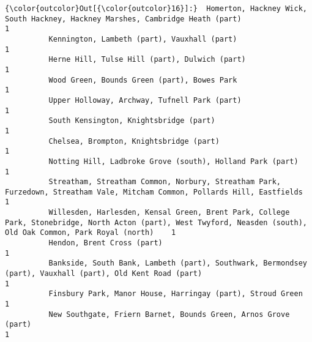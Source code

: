 \documentclass[11pt]{article}
\begin{document}
\begin{Verbatim}[commandchars=\\\{\}]
{\color{outcolor}Out[{\color{outcolor}16}]:}  Homerton, Hackney Wick, South Hackney, Hackney Marshes, Cambridge Heath (part)                                                                                      1
          Kennington, Lambeth (part), Vauxhall (part)                                                                                                                         1
          Herne Hill, Tulse Hill (part), Dulwich (part)                                                                                                                       1
          Wood Green, Bounds Green (part), Bowes Park                                                                                                                         1
          Upper Holloway, Archway, Tufnell Park (part)                                                                                                                        1
          South Kensington, Knightsbridge (part)                                                                                                                              1
          Chelsea, Brompton, Knightsbridge (part)                                                                                                                             1
          Notting Hill, Ladbroke Grove (south), Holland Park (part)                                                                                                           1
          Streatham, Streatham Common, Norbury, Streatham Park, Furzedown, Streatham Vale, Mitcham Common, Pollards Hill, Eastfields                                          1
          Willesden, Harlesden, Kensal Green, Brent Park, College Park, Stonebridge, North Acton (part), West Twyford, Neasden (south), Old Oak Common, Park Royal (north)    1
          Hendon, Brent Cross (part)                                                                                                                                          1
          Bankside, South Bank, Lambeth (part), Southwark, Bermondsey (part), Vauxhall (part), Old Kent Road (part)                                                           1
          Finsbury Park, Manor House, Harringay (part), Stroud Green                                                                                                          1
          New Southgate, Friern Barnet, Bounds Green, Arnos Grove (part)                                                                                                      1

\end{Verbatim}
\end{document}
